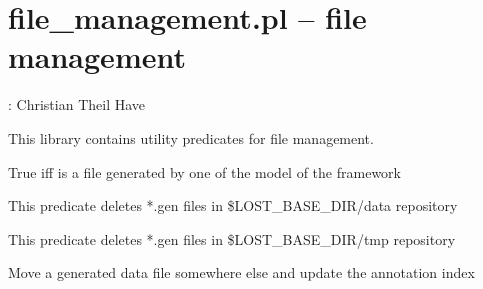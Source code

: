 


\section{file_management.pl -- file management}

\label{sec:filemanagement}

\begin{tags}
: Christian Theil Have
\end{tags}

This library contains utility predicates for file management.\vspace{0.7cm}

\begin{description}
True iff  is a file generated by one of the model of the framework

This predicate deletes *.gen files in \$LOST_BASE_DIR/data repository

This predicate deletes *.gen files in \$LOST_BASE_DIR/tmp repository

Move a generated data file somewhere else and update the annotation index
\end{description}

